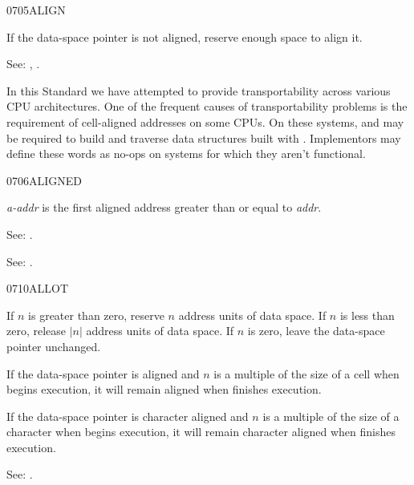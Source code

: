 \begin{newword}{0705}{ALIGN}
	\stack{}{}

	If the data-space pointer is not aligned, reserve enough space
	to align it.

\item[See:]	
	,
	.

	\begin{rationale} %
		In this Standard we have attempted to provide transportability
		across various CPU architectures. One of the frequent causes
		of transportability problems is the requirement of cell-aligned
		addresses on some CPUs. On these systems,  and
		 may be required to build and traverse data
		structures built with . Implementors may define these
		words as no-ops on systems for which they aren't functional.
	\end{rationale}
\end{newword}


\begin{newword}{0706}{ALIGNED}

	\emph{a-addr} is the first aligned address greater than or equal
	to \emph{addr}.

\item[See:]
	.

	\begin{rationale} %
		See: .
	\end{rationale}
\end{newword}


\begin{newword}{0710}{ALLOT}

	If $n$ is greater than zero, reserve $n$ address units of data
	space. If $n$ is less than zero, release $|n|$ address units
	of data space. If $n$ is zero, leave the data-space pointer
	unchanged.

	If the data-space pointer is aligned and $n$ is a multiple of
	the size of a cell when  begins execution, it will
	remain aligned when  finishes execution.

	If the data-space pointer is character aligned and $n$ is a
	multiple of the size of a character when  begins
	execution, it will remain character aligned when 
	finishes execution.

\item[See:]
	.
\end{newword}


